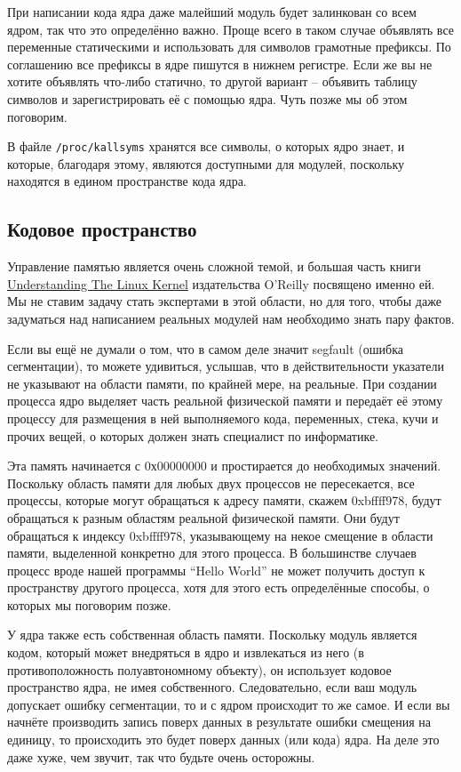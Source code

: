 \documentclass[10pt, oneside]{book}
\begin{document}
При написании кода ядра даже малейший модуль будет залинкован со всем ядром, так что это определённо важно. Проще всего в таком случае объявлять все переменные статическими и использовать для символов грамотные префиксы. По соглашению все префиксы в ядре пишутся в нижнем регистре. Если же вы не хотите объявлять что-либо статично, то другой вариант – объявить таблицу символов и зарегистрировать её с помощью ядра. Чуть позже мы об этом поговорим.

В файле \verb|/proc/kallsyms| хранятся все символы, о которых ядро знает, и которые, благодаря этому, являются доступными для модулей, поскольку находятся в едином пространстве кода ядра.

\subsection{Кодовое пространство}
\label{sec:codespace}
Управление памятью является очень сложной темой, и большая часть книги \href{https://www.oreilly.com/library/view/understanding-the-linux/0596005652/}{Understanding The Linux Kernel} издательства O’Reilly посвящено именно ей. Мы не ставим задачу стать экспертами в этой области, но для того, чтобы даже задуматься над написанием реальных модулей нам необходимо знать пару фактов.

Если вы ещё не думали о том, что в самом деле значит segfault (ошибка сегментации), то можете удивиться, услышав, что в действительности указатели не указывают на области памяти, по крайней мере, на реальные. При создании процесса ядро выделяет часть реальной физической памяти и передаёт её этому процессу для размещения в ней выполняемого кода, переменных, стека, кучи и прочих вещей, о которых должен знать специалист по информатике.

Эта память начинается с 0х00000000 и простирается до необходимых значений. Поскольку область памяти для любых двух процессов не пересекается, все процессы, которые могут обращаться к адресу памяти, скажем 0xbffff978, будут обращаться к разным областям реальной физической памяти. Они будут обращаться к индексу 0xbffff978, указывающему на некое смещение в области памяти, выделенной конкретно для этого процесса. В большинстве случаев процесс вроде нашей программы “Hello World” не может получить доступ к пространству другого процесса, хотя для этого есть определённые способы, о которых мы поговорим позже.

У ядра также есть собственная область памяти. Поскольку модуль является кодом, который может внедряться в ядро и извлекаться из него (в противоположность
полуавтономному объекту), он использует кодовое пространство ядра, не имея собственного. Следовательно, если ваш модуль допускает ошибку сегментации, то и с ядром происходит то же самое. И если вы начнёте производить запись поверх данных в результате ошибки смещения на единицу, то происходить это будет поверх данных (или кода) ядра. На деле это даже хуже, чем звучит, так что будьте очень осторожны.
\end{document}
